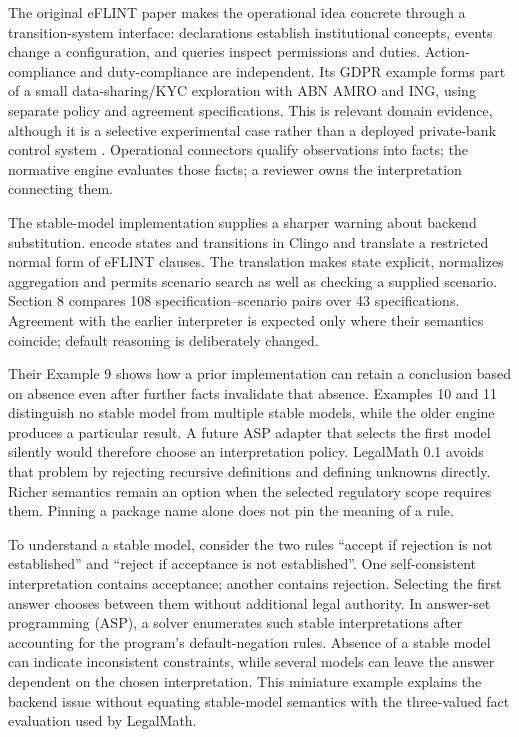 \documentclass[12pt,a4paper,oneside,openany]{book}
\begin{document}
The original eFLINT paper makes the operational idea concrete through a
transition-system interface: declarations establish institutional concepts,
events change a configuration, and queries inspect permissions and duties.
Action-compliance and duty-compliance are independent. Its GDPR example forms
part of a small data-sharing/KYC exploration with ABN AMRO and ING, using separate
policy and agreement specifications. This is relevant domain evidence, although
it is a selective experimental case rather than a deployed private-bank control
system \citep[secs.~3--5]{eflint2020}. Operational connectors qualify observations
into facts; the normative engine evaluates those facts; a reviewer owns the
interpretation connecting them.

The stable-model implementation supplies a sharper warning about backend
substitution. \citet[secs.~4--7]{eflintstable2025} encode states and transitions
in Clingo and translate a restricted normal form of eFLINT clauses. The
translation makes state explicit, normalizes aggregation and permits scenario
search as well as checking a supplied scenario. Section 8 compares 108
specification--scenario pairs over 43 specifications. Agreement with the earlier
interpreter is expected only where their semantics coincide; default reasoning
is deliberately changed.

Their Example 9 shows how a prior implementation can retain a conclusion based
on absence even after further facts invalidate that absence. Examples 10 and 11
distinguish no stable model from multiple stable models, while the older engine
produces a particular result. A future ASP adapter that selects the first model
silently would therefore choose an interpretation policy. LegalMath 0.1 avoids
that problem by rejecting recursive definitions and defining unknowns directly.
Richer semantics remain an option when the selected regulatory scope requires
them. Pinning a package name alone does not pin the meaning of a rule.

To understand a stable model, consider the two rules ``accept if rejection is
not established'' and ``reject if acceptance is not established''. One
self-consistent interpretation contains acceptance; another contains rejection.
Selecting the first answer chooses between them without additional legal
authority. In answer-set programming (ASP), a solver enumerates such stable
interpretations after accounting for the program's default-negation rules.
Absence of a stable model can indicate inconsistent constraints, while several models can leave
the answer dependent on the chosen interpretation. This miniature example
explains the backend issue without equating stable-model semantics with the
three-valued fact evaluation used by LegalMath.
\end{document}
